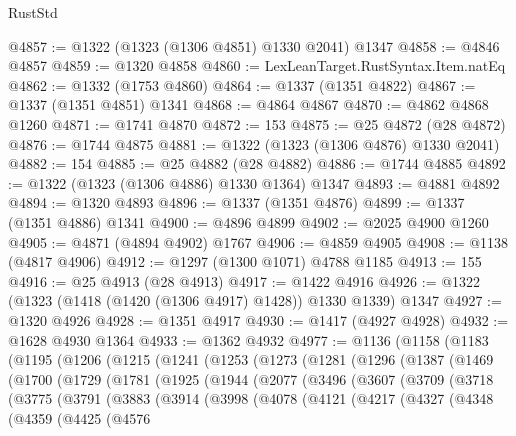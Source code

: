 \begin{lexlean}{RustStd}
\begin{coremodule}
@4857 := @1322 (@1323 (@1306 @4851) @1330 @2041) @1347
@4858 := @4846 @4857
@4859 := @1320 @4858
@4860 := LexLeanTarget.RustSyntax.Item.natEq
@4862 := @1332 (@1753 @4860)
@4864 := @1337 (@1351 @4822)
@4867 := @1337 (@1351 @4851) @1341
@4868 := @4864 @4867
@4870 := @4862 @4868 @1260
@4871 := @1741 @4870
@4872 := 153
@4875 := @25 @4872 (@28 @4872)
@4876 := @1744 @4875
@4881 := @1322 (@1323 (@1306 @4876) @1330 @2041)
@4882 := 154
@4885 := @25 @4882 (@28 @4882)
@4886 := @1744 @4885
@4892 := @1322 (@1323 (@1306 @4886) @1330 @1364) @1347
@4893 := @4881 @4892
@4894 := @1320 @4893
@4896 := @1337 (@1351 @4876)
@4899 := @1337 (@1351 @4886) @1341
@4900 := @4896 @4899
@4902 := @2025 @4900 @1260
@4905 := @4871 (@4894 @4902) @1767
@4906 := @4859 @4905
@4908 := @1138 (@4817 @4906)
@4912 := @1297 (@1300 @1071) @4788 @1185
@4913 := 155
@4916 := @25 @4913 (@28 @4913)
@4917 := @1422 @4916
@4926 := @1322 (@1323 (@1418 (@1420 (@1306 @4917) @1428)) @1330 @1339) @1347
@4927 := @1320 @4926
@4928 := @1351 @4917
@4930 := @1417 (@4927 @4928)
@4932 := @1628 @4930 @1364
@4933 := @1362 @4932
@4977 := @1136
    (@1158
      (@1183
        (@1195
          (@1206
            (@1215
              (@1241
                (@1253
                  (@1273
                    (@1281
                      (@1296
                        (@1387
                          (@1469
                            (@1700
                              (@1729
                                (@1781
                                  (@1925
                                    (@1944
                                      (@2077
                                        (@3496
                                          (@3607
                                            (@3709
                                              (@3718
                                                (@3775
                                                  (@3791
                                                    (@3883
                                                      (@3914
                                                        (@3998
                                                          (@4078
                                                            (@4121
                                                              (@4217
                                                                (@4327
                                                                  (@4348
                                                                    (@4359
                                                                      (@4425
                                                                        (@4576

\end{coremodule}
\end{lexlean}
